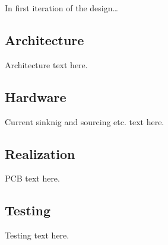 \IEEEPARstart
{I}{n} first iteration of the design\dots

\subsection{Architecture}
Architecture text here.
\subsection{Hardware}
Current sinknig and sourcing etc. text here.
\subsection{Realization}
PCB text here.
\subsection{Testing}
Testing text here.